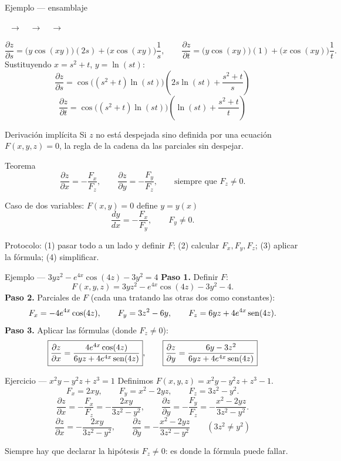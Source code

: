 \documentclass[11pt,aspectratio=169]{beamer}
\newcommand{\rctracker}[1]{%
  {\footnotesize\centering
  \pasoitem{1}{1. Dependencias}{#1}\ $\rightarrow$\
  \pasoitem{2}{2. Parciales de $z$}{#1}\ $\rightarrow$\
  \pasoitem{3}{3. Derivar intermedias}{#1}\ $\rightarrow$\
  \pasoitem{4}{4. Sustituir y sumar}{#1}\par}
  \vspace{4pt}
}
\begin{document}
\begin{frame}{Ejemplo --- ensamblaje}
  \rctracker{4}
  \[
    \frac{\partial z}{\partial s}=\bigl(y\cos(xy)\bigr)(2s)+\bigl(x\cos(xy)\bigr)\frac1s,
    \qquad
    \frac{\partial z}{\partial t}=\bigl(y\cos(xy)\bigr)(1)+\bigl(x\cos(xy)\bigr)\frac1t.
  \]
  \pause
  Sustituyendo $x=s^2+t$, $y=\ln(st)$:
  \[
    \boxed{\frac{\partial z}{\partial s}=\cos\bigl((s^2+t)\ln(st)\bigr)\left(2s\ln(st)+\frac{s^2+t}{s}\right)}
  \]
  \pause
  \[
    \boxed{\frac{\partial z}{\partial t}=\cos\bigl((s^2+t)\ln(st)\bigr)\left(\ln(st)+\frac{s^2+t}{t}\right)}
  \]
\end{frame}

\begin{frame}{Derivación implícita}
  Si $z$ no está despejada sino definida por una ecuación $F(x,y,z)=0$, la regla de la cadena da las parciales sin despejar.
  \pause
  \begin{block}{Teorema}
    \[
      \frac{\partial z}{\partial x}=-\frac{F_x}{F_z},
      \qquad
      \frac{\partial z}{\partial y}=-\frac{F_y}{F_z},
      \qquad\text{siempre que } F_z\neq 0.
    \]
  \end{block}
  \pause
  \begin{block}{Caso de dos variables: $F(x,y)=0$ define $y=y(x)$}
    \[
      \frac{dy}{dx}=-\frac{F_x}{F_y},\qquad F_y\neq 0.
    \]
  \end{block}
  \pause
  \begin{center}\small\color{gray60} Protocolo: (1) pasar todo a un lado y definir $F$; (2) calcular $F_x,F_y,F_z$; (3) aplicar la fórmula; (4) simplificar.\end{center}
\end{frame}

\begin{frame}{Ejemplo --- $3yz^2-e^{4x}\cos(4z)-3y^2=4$}
  \textbf{Paso 1.} Definir $F$:
  \[
    F(x,y,z)=3yz^2-e^{4x}\cos(4z)-3y^2-4.
  \]
  \pause
  \textbf{Paso 2.} Parciales de $F$ (cada una tratando las otras dos como constantes):
  \[
    F_x=-4e^{4x}\cos(4z),\qquad
    F_y=3z^2-6y,\qquad
    F_z=6yz+4e^{4x}\operatorname{sen}(4z).
  \]
  \pause
  \textbf{Paso 3.} Aplicar las fórmulas (donde $F_z\neq 0$):
  \[
    \boxed{\frac{\partial z}{\partial x}=\frac{4e^{4x}\cos(4z)}{6yz+4e^{4x}\operatorname{sen}(4z)}},
    \qquad
    \boxed{\frac{\partial z}{\partial y}=\frac{6y-3z^2}{6yz+4e^{4x}\operatorname{sen}(4z)}}
  \]
\end{frame}

\begin{frame}{Ejercicio --- $x^2y-y^2z+z^3=1$}
  Definimos $F(x,y,z)=x^2y-y^2z+z^3-1$.
  \pause
  \[
    F_x=2xy,\qquad F_y=x^2-2yz,\qquad F_z=3z^2-y^2.
  \]
  \pause
  \[
    \frac{\partial z}{\partial x}=-\frac{F_x}{F_z}=-\frac{2xy}{3z^2-y^2},
    \qquad
    \frac{\partial z}{\partial y}=-\frac{F_y}{F_z}=-\frac{x^2-2yz}{3z^2-y^2}.
  \]
  \pause
  \[
    \boxed{\frac{\partial z}{\partial x}=-\frac{2xy}{3z^2-y^2},\qquad
           \frac{\partial z}{\partial y}=-\frac{x^2-2yz}{3z^2-y^2}}
    \qquad (3z^2\neq y^2)
  \]
  \pause
  \begin{center}\small\color{gray60} Siempre hay que declarar la hipótesis $F_z\neq 0$: es donde la fórmula puede fallar.\end{center}
\end{frame}
\end{document}
